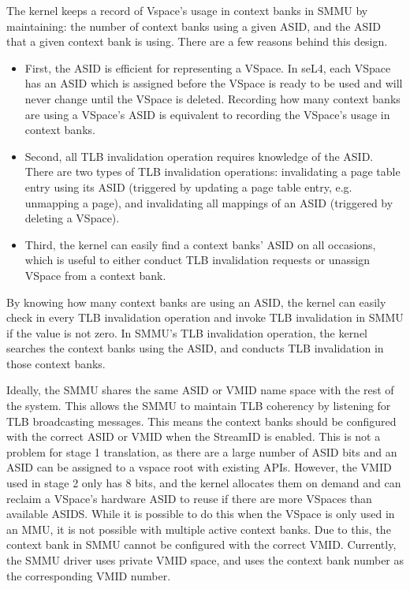The kernel keeps a record of Vspace's usage in context banks in SMMU by
maintaining: the number of context banks using a given ASID, and the ASID that a
given context bank is using. There are a few reasons behind this design.
\begin{itemize}
\item First, the ASID is efficient for representing a VSpace. In seL4, each VSpace has
an ASID which is assigned before the VSpace is ready to be used and will never
change until the VSpace is deleted. Recording how many context banks are using a
VSpace's ASID is equivalent to recording the VSpace's usage in context banks.
\item Second, all TLB invalidation operation requires knowledge of the ASID. There are
two types of TLB invalidation operations: invalidating a page table entry using
its ASID (triggered by updating a page table entry, e.g. unmapping a page), and
invalidating all mappings of an ASID (triggered by deleting a VSpace).
\item Third, the kernel can easily find a context banks' ASID on all occasions, which is
useful to either conduct TLB invalidation requests or unassign VSpace from a
context bank.
\end{itemize}

By knowing how many context banks are using an ASID, the kernel can easily check
in every TLB invalidation operation and invoke TLB invalidation in SMMU if the
value is not zero. In SMMU's TLB invalidation operation, the kernel searches the
context banks using the ASID, and conducts TLB invalidation in those context banks.

Ideally, the SMMU shares the same ASID or VMID name space with the rest of the
system. This allows the SMMU to maintain TLB coherency by listening for TLB
broadcasting messages. This means the context banks should be configured with
the correct ASID or VMID when the StreamID is enabled. This is not a problem for
stage 1 translation, as there are a large number of ASID bits and an ASID can be
assigned to a vspace root with existing APIs. However, the VMID used in stage 2
only has 8 bits, and the kernel allocates them on demand and can reclaim a
VSpace's hardware ASID to reuse if there are more VSpaces than available ASIDS.
While it is possible to do this when the VSpace is only used in an MMU, it is
not possible with multiple active context banks.
Due to this, the context bank in SMMU cannot be configured with the correct VMID.
Currently, the SMMU driver uses private VMID space, and uses the context bank
number as the corresponding VMID number.




